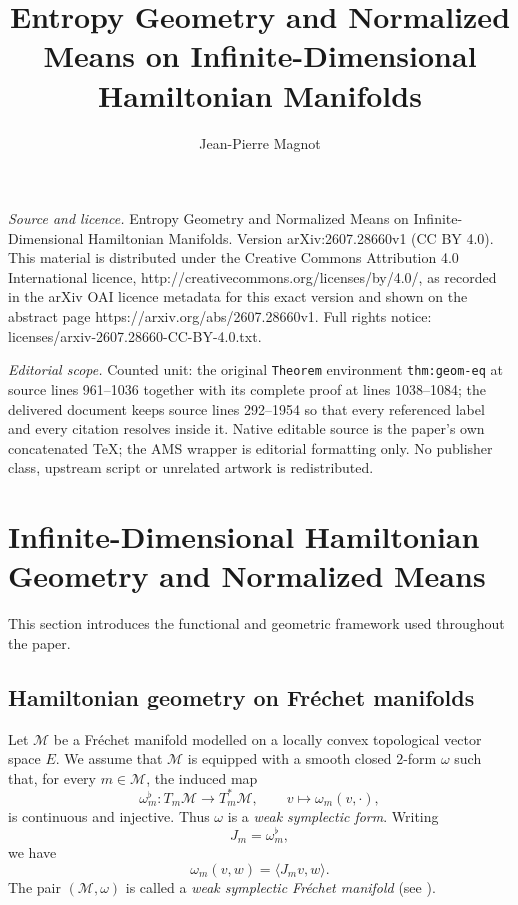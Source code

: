 \documentclass[10pt,a4paper]{amsart}
\begin{document}
\title[Entropy Geometry and Normalized Means on Infinite-Dimensiona]{Entropy Geometry and Normalized Means on Infinite-Dimensional Hamiltonian Manifolds}
\author{Jean-Pierre Magnot}
\date{}
\maketitle
\noindent\emph{Source and licence.} Entropy Geometry and Normalized Means on Infinite-Dimensional Hamiltonian Manifolds. Version arXiv:2607.28660v1 (CC BY 4.0). This material is distributed under the Creative Commons Attribution 4.0 International licence, http://creativecommons.org/licenses/by/4.0/, as recorded in the arXiv OAI licence metadata for this exact version and shown on the abstract page https://arxiv.org/abs/2607.28660v1. Full rights notice: licenses/arxiv-2607.28660-CC-BY-4.0.txt.\par\smallskip
\noindent\textit{Editorial scope.} Counted unit: the original \texttt{Theorem} environment \texttt{thm:geom-eq} at source lines 961--1036 together with its complete proof at lines 1038--1084; the delivered document keeps source lines 292--1954 so that every referenced label and every citation resolves inside it. Native editable source is the paper's own concatenated TeX; the AMS wrapper is editorial formatting only. No publisher class, upstream script or unrelated artwork is redistributed.
\section{Infinite-Dimensional Hamiltonian Geometry and Normalized Means}

This section introduces the functional and geometric framework used
throughout the paper.

\subsection{Hamiltonian geometry on Fréchet manifolds}

Let $\mathcal M$ be a Fréchet manifold modelled on a locally convex
topological vector space $E$. We assume that $\mathcal M$ is equipped
with a smooth closed $2$-form $\omega$ such that, for every
$m\in\mathcal M$, the induced map
\[
\omega_m^\flat\colon T_m\mathcal M\longrightarrow T_m^*\mathcal M,
\qquad
v\longmapsto\omega_m(v,\cdot),
\]
is continuous and injective. Thus $\omega$ is a \emph{weak symplectic
form}. Writing
\[
J_m=\omega_m^\flat,
\]
we have
\[
\omega_m(v,w)=\langle J_m v,w\rangle.
\]
The pair $(\mathcal M,\omega)$ is called a \emph{weak symplectic
Fréchet manifold} (see \cite{Hamilton82,Neeb06,KM97}).
\end{document}
